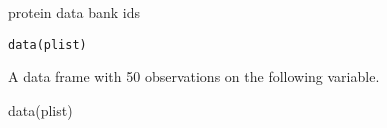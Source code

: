 \begin{Description} protein data bank ids
\end{Description}
\begin{Usage}
\begin{verbatim}data(plist)\end{verbatim}
\end{Usage}
\begin{Format}\relax
A data frame with 50 observations on the following variable.
\end{Format}
\begin{Examples}
\begin{ExampleCode}
data(plist)

\end{ExampleCode}
\end{Examples}

